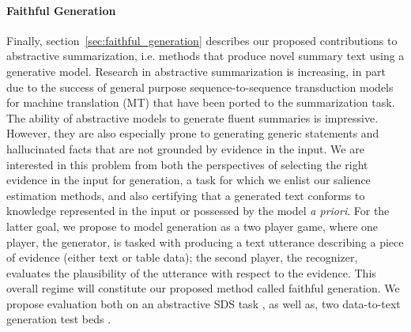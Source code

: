 \paragraph{Faithful Generation} Finally, section~\ref{sec:faithful_generation} describes our proposed 
contributions to
abstractive summarization, i.e. methods that produce novel 
summary text using a generative model. 
Research in abstractive summarization is increasing, in part due to
the success of general purpose sequence-to-sequence transduction models 
for machine translation (MT) that have been ported to the summarization task.
The ability of abstractive models to generate fluent 
summaries is impressive. However, they are also especially prone 
to generating generic statements and hallucinated facts that are not grounded 
by evidence in the input. %
We are interested in this problem from both the perspectives of selecting
the right evidence in the input for generation, a task for which we enlist
our salience estimation methods, and also certifying that a generated text
conforms to knowledge represented in the input or possessed by the model
\textit{a priori}. For the latter goal, we propose to model generation as a two player
game, where one player, the generator, is tasked with producing a text
utterance describing a piece of evidence (either text or table data);
the second player, the recognizer, %
evaluates the plausibility of the utterance with respect to the evidence.
This overall regime will constitute our proposed method called
 faithful generation.
We propose 
evaluation both on an abstractive SDS task \citep{volske2017tl}, 
as well as, two data-to-text generation 
test beds \citep{lebret2016neural,novikova2017e2e}.





